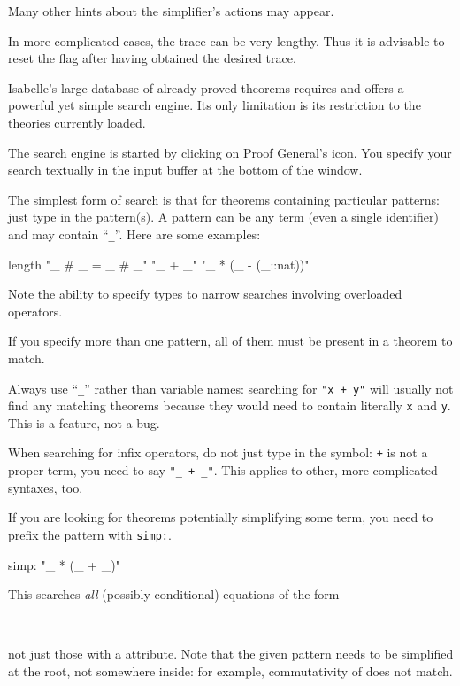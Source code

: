 \begin{isabellebody}
\begin{isamarkuptext}
Many other hints about the simplifier's actions may appear.

In more complicated cases, the trace can be very lengthy.  Thus it is
advisable to reset the  flag after having
obtained the desired trace.%
\end{isamarkuptext}%
\isamarkuptrue%
%
\isamarkuptrue%
%
\begin{isamarkuptext}%
Isabelle's large database of already proved theorems requires
and offers a powerful yet simple search engine. Its only limitation is
its restriction to the theories currently loaded.

\begin{pgnote}
The search engine is started by clicking on Proof General's  icon.
You specify your search textually in the input buffer at the bottom
of the window.
\end{pgnote}

The simplest form of search is that for theorems containing particular
patterns: just type in the pattern(s). A pattern can be any term (even
a single identifier) and may contain ``\texttt{\_}''. Here are some
examples:
\begin{ttbox}
length
"_ # _ = _ # _"
"_ + _"
"_ * (_ - (_::nat))"
\end{ttbox}
Note the ability to specify types to narrow searches involving overloaded
operators.

If you specify more than one pattern, all of them must be present in a
theorem to match.

\begin{warn}
Always use ``\texttt{\_}'' rather than variable names: searching for
\texttt{"x + y"} will usually not find any matching theorems
because they would need to contain literally \texttt{x} and \texttt{y}.
This is a feature, not a  bug.

When searching for infix operators, do not just type in the symbol:
\texttt{+} is not a proper term, you  need to say \texttt{"_ + _"}.
This applies to other, more complicated syntaxes, too.
\end{warn}

If you are looking for theorems potentially simplifying some term, you
need to prefix the pattern with \texttt{simp:}.
\begin{ttbox}
simp: "_ * (_ + _)"
\end{ttbox}
This searches \emph{all} (possibly conditional) equations of the form
\begin{isabelle}%
\ \ \ \ \ {\isacharunderscore}\ {\isacharasterisk}\ {\isacharparenleft}{\isacharunderscore}\ {\isacharplus}\ {\isacharunderscore}{\isacharparenright}\ {\isacharequal}\ {\isasymdots}%
\end{isabelle}
not just those with a  attribute.
Note that the given pattern needs to be simplified
at the root, not somewhere inside: for example, commutativity of \isa{{\isacharplus}}
does not match.


\end{isamarkuptext}
\end{isabellebody}
